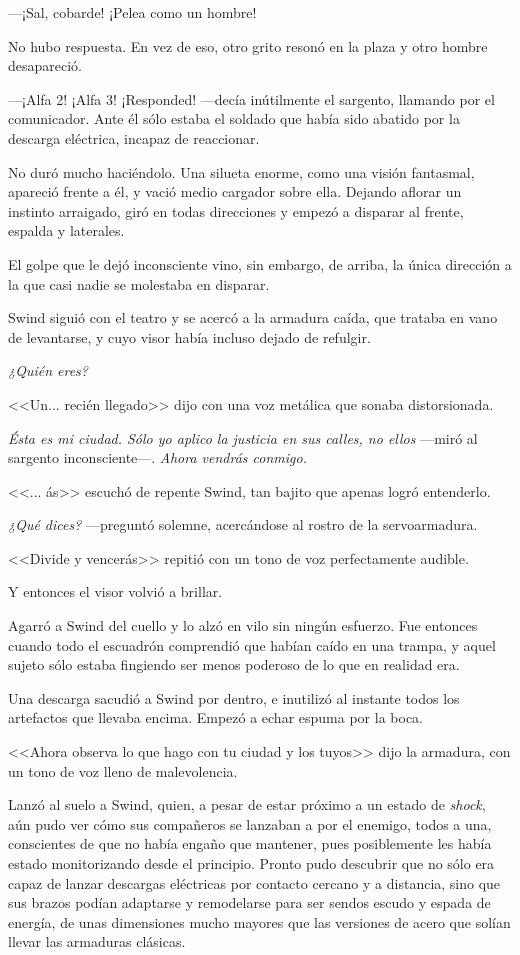 ---¡Sal, cobarde! ¡Pelea como un hombre!

No hubo respuesta. En vez de eso, otro grito resonó en la plaza y otro hombre desapareció.

---¡Alfa 2! ¡Alfa 3! ¡Responded! ---decía inútilmente el sargento, llamando por el comunicador. Ante él sólo estaba el soldado que había sido abatido por la descarga eléctrica, incapaz de reaccionar.

No duró mucho haciéndolo. Una silueta enorme, como una visión fantasmal, apareció frente a él, y vació medio cargador sobre ella. Dejando aflorar un instinto arraigado, giró en todas direcciones y empezó a disparar al frente, espalda y laterales.

El golpe que le dejó inconsciente vino, sin embargo, de arriba, la única dirección a la que casi nadie se molestaba en disparar.

Swind siguió con el teatro y se acercó a la armadura caída, que trataba en vano de levantarse, y cuyo visor había incluso dejado de refulgir.

\emph{¿Quién eres?}

<<Un... recién llegado>> dijo con una voz metálica que sonaba distorsionada.

\emph{Ésta es mi ciudad. Sólo yo aplico la justicia en sus calles, no ellos} ---miró al sargento inconsciente---. \emph{Ahora vendrás conmigo.}

<<... ás>> escuchó de repente Swind, tan bajito que apenas logró entenderlo.

\emph{¿Qué dices?} ---preguntó solemne, acercándose al rostro de la servoarmadura.

<<Divide y vencerás>> repitió con un tono de voz perfectamente audible.

Y entonces el visor volvió a brillar.

Agarró a Swind del cuello y lo alzó en vilo sin ningún esfuerzo. Fue entonces cuando todo el escuadrón comprendió que habían caído en una trampa, y aquel sujeto sólo estaba fingiendo ser menos poderoso de lo que en realidad era.

Una descarga sacudió a Swind por dentro, e inutilizó al instante todos los artefactos que llevaba encima. Empezó a echar espuma por la boca.

<<Ahora observa lo que hago con tu ciudad y los tuyos>> dijo la armadura, con un tono de voz lleno de malevolencia.

Lanzó al suelo a Swind, quien, a pesar de estar próximo a un estado de \emph{shock}, aún pudo ver cómo sus compañeros se lanzaban a por el enemigo, todos a una, conscientes de que no había engaño que mantener, pues posiblemente les había estado monitorizando desde el principio. Pronto pudo descubrir que no sólo era capaz de lanzar descargas eléctricas por contacto cercano y a distancia, sino que sus brazos podían adaptarse y remodelarse para ser sendos escudo y espada de energía, de unas dimensiones mucho mayores que las versiones de acero que solían llevar las armaduras clásicas.

